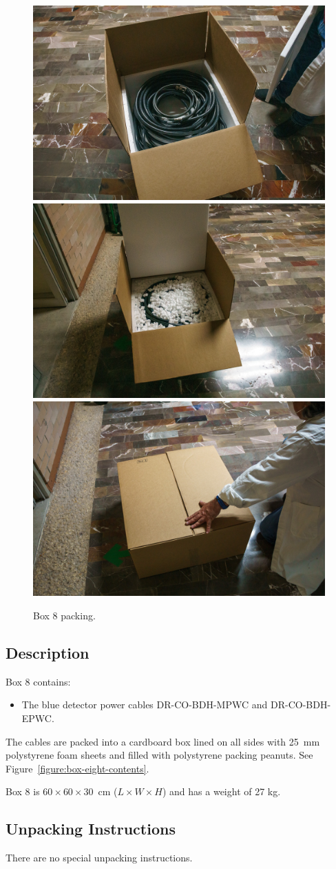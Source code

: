 \documentclass{article}
\begin{document}
\begin{figure}[bp]
\begin{center}
\includegraphics[width=0.30\linewidth]{figures/20201207T192420.jpg}
\includegraphics[width=0.30\linewidth]{figures/20201207T192712.jpg}
\includegraphics[width=0.30\linewidth]{figures/20201207T192933.jpg}
\end{center}
\caption{Box 8 packing.}
\label{figure:box-eight-packing}
\end{figure}

\subsection{Description}

Box 8 contains:

\begin{itemize}
    \item The blue detector power cables DR-CO-BDH-MPWC and DR-CO-BDH-EPWC.
\end{itemize}

The cables are packed into a cardboard box lined on all sides with 25~mm polystyrene foam sheets and filled with polystyrene packing peanuts. See Figure~\ref{figure:box-eight-contents}.

Box 8 is  $60 \times 60 \times 30$~cm ($L \times W \times H$) and has a weight of 27 kg.

\subsection{Unpacking Instructions}

There are no special unpacking instructions.
\end{document}
